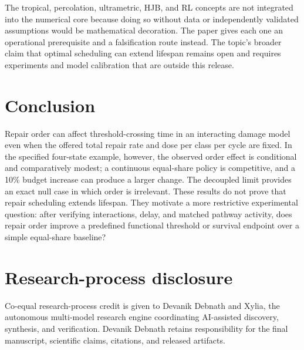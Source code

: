 \documentclass[10pt,letterpaper]{article}
\begin{document}
The tropical, percolation, ultrametric, HJB, and RL concepts are not integrated into the numerical core because doing so without data or independently validated assumptions would be mathematical decoration. The paper gives each one an operational prerequisite and a falsification route instead. The topic's broader claim that optimal scheduling can extend lifespan remains open and requires experiments and model calibration that are outside this release.

\section{Conclusion}
Repair order can affect threshold-crossing time in an interacting damage model even when the offered total repair rate and dose per class per cycle are fixed. In the specified four-state example, however, the observed order effect is conditional and comparatively modest; a continuous equal-share policy is competitive, and a 10\% budget increase can produce a larger change. The decoupled limit provides an exact null case in which order is irrelevant. These results do not prove that repair scheduling extends lifespan. They motivate a more restrictive experimental question: after verifying interactions, delay, and matched pathway activity, does repair order improve a predefined functional threshold or survival endpoint over a simple equal-share baseline?

\section*{Research-process disclosure}
Co-equal research-process credit is given to Devanik Debnath and Xylia, the autonomous multi-model research engine coordinating AI-assisted discovery, synthesis, and verification. Devanik Debnath retains responsibility for the final manuscript, scientific claims, citations, and released artifacts.



\end{document}
